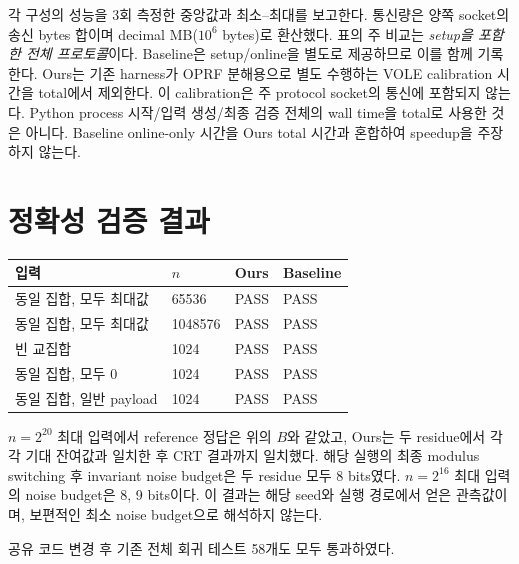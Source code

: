 \documentclass[11pt,a4paper]{article}
\begin{document}
각 구성의 성능을 3회 측정한 중앙값과 최소--최대를 보고한다.
통신량은 양쪽 socket의 송신 bytes 합이며 decimal MB($10^6$ bytes)로 환산했다.
표의 주 비교는 \emph{setup을 포함한 전체 프로토콜}이다.
Baseline은 setup/online을 별도로 제공하므로 이를 함께 기록한다.
Ours는 기존 harness가 OPRF 분해용으로 별도 수행하는 VOLE calibration 시간을 total에서 제외한다.
이 calibration은 주 protocol socket의 통신에 포함되지 않는다.
Python process 시작/입력 생성/최종 검증 전체의 wall time을 total로 사용한 것은 아니다.
Baseline online-only 시간을 Ours total 시간과 혼합하여 speedup을 주장하지 않는다.

\section{정확성 검증 결과}
\begin{center}\begin{tabular}{llll}\toprule 입력 & $n$ & Ours & Baseline \\ \midrule
동일 집합, 모두 최대값 & 65536 & PASS & PASS \\
동일 집합, 모두 최대값 & 1048576 & PASS & PASS \\
빈 교집합 & 1024 & PASS & PASS \\
동일 집합, 모두 0 & 1024 & PASS & PASS \\
동일 집합, 일반 payload & 1024 & PASS & PASS \\
\bottomrule\end{tabular}\end{center}

$n=2^{20}$ 최대 입력에서 reference 정답은 위의 $B$와 같았고,
Ours는 두 residue에서 각각 기대 잔여값과 일치한 후 CRT 결과까지 일치했다.
해당 실행의 최종 modulus switching 후 invariant noise budget은 두 residue 모두 8 bits였다.
$n=2^{16}$ 최대 입력의 noise budget은 8, 9 bits이다.
이 결과는 해당 seed와 실행 경로에서 얻은 관측값이며, 보편적인 최소 noise budget으로 해석하지 않는다.

공유 코드 변경 후 기존 전체 회귀 테스트 58개도 모두 통과하였다.
\end{document}

